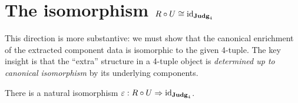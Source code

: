 \section{The isomorphism $R \circ U \cong \mathrm{id}_{\mathbf{Judg}_4}$}
\label{sec:RU}

This direction is more substantive: we must show that the canonical
enrichment of the extracted component data is isomorphic to the given
4-tuple.  The key insight is that the ``extra'' structure in a 4-tuple
object is \emph{determined up to canonical isomorphism} by its
underlying components.

\begin{theorem}
\label{thm:RU}
There is a natural isomorphism $\varepsilon : R \circ U
\Rightarrow \mathrm{id}_{\mathbf{Judg}_4}$.
\end{theorem}


